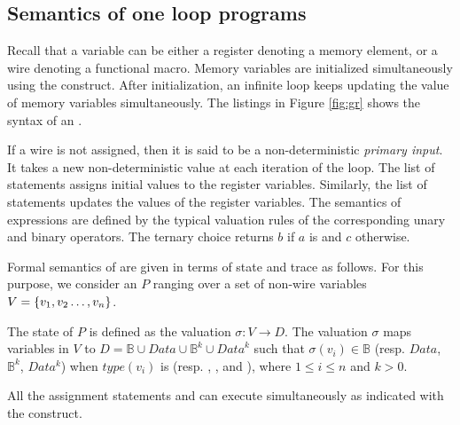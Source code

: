 %
\subsection{Semantics of one loop programs}
%


Recall that a variable can be either a register
denoting a memory element, 
or a wire denoting a functional macro. 
Memory variables are initialized simultaneously using the 
 construct. 
After initialization, an infinite loop keeps updating the 
value of memory variables simultaneously. 
The listings in Figure \ref{fig:gr} shows the syntax of 
an \caig. 



If a wire is not assigned, then it is said to be a 
non-deterministic {\em primary input}. 
It takes a new non-deterministic value at each iteration of 
the loop.
The list of statements  assigns initial values to 
the register variables.
Similarly, the  list of statements updates 
the values of the register variables. 
The semantics of \caig expressions are defined by the typical 
valuation rules of the corresponding unary and binary operators. 
The ternary choice  returns $b$ if $a$ 
is \true and $c$ otherwise. 



Formal semantics of \caig are given in terms of \caig state and trace as follows. 
%
For this purpose, we consider an \caig $P$ ranging over a set of 
non-wire variables $V=\{ v_1,v_2\ldots,v_n \}$.


\begin{definition}
The state of $P$ is defined as 
the valuation 
$\sigma: V \rightarrow D$. 
The valuation $\sigma$ maps variables in 
$V$ to $ D = \mathbb{B} \cup \mathit{Data} \cup \mathbb{B}^k \cup \mathit{Data}^k$ 
such that $\sigma(v_i) \in \mathbb{B}$ (resp. $Data$, $\mathbb{B}^k$, $Data^k$) when $\mathit{type}(v_i)$ is  (resp. , 
, and ), where $1 \le i \le n$ and $k >0$.
\end{definition}



\begin{definition}
All the assignment statements  and 
 can execute
simultaneously as indicated with the  
construct.
\end{definition}



